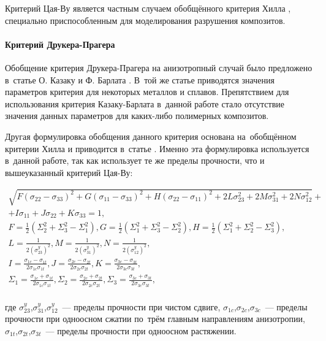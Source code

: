 \documentclass[thesis.tex]{subfiles}
\begin{document}
Критерий Цая-Ву является частным случаем обобщённого критерия Хилла \cite{hill1979theoretical,abrate2008criteria},
специально приспособленным для моделирования разрушения композитов.

\paragraph{Критерий Друкера-Прагера}
Обобщение критерия Друкера-Прагера на анизотропный случай было предложено в~статье О. Казаку и Ф. Барлата
\cite{cazacu2001generalization}. В~той же статье приводятся значения параметров критерия для некоторых металлов и сплавов.
Препятствием для использования критерия Казаку-Барлата в~данной работе стало отсутствие значения данных параметров для
каких-либо полимерных композитов.

Другая формулировка обобщения данного критерия основана на~обобщённом  критерии Хилла и приводится в~статье \cite{liu1997asymmetric}.
Именно эта формулировка используется в~данной работе, так как использует те же пределы прочности, что и вышеуказанный
критерий Цая-Ву:
\newpage
\begin{small}
\begin{gather}
    \sqrt{F(\sigma_{22}-\sigma_{33})^2 + G(\sigma_{11}-\sigma_{33})^2 + H(\sigma_{22}-\sigma_{11})^2+
    2L\sigma_{23}^2+2M\sigma_{31}^2+2N\sigma_{12}^2} + \nonumber \\
    + I\sigma_{11}+J\sigma_{22}+K\sigma_{33} = 1,\\
    F=\frac{1}{2}(\Sigma_2^2+\Sigma_3^2-\Sigma_1^2),
    G=\frac{1}{2}(\Sigma_1^2+\Sigma_3^2-\Sigma_2^2),
    H=\frac{1}{2}(\Sigma_1^2+\Sigma_2^2-\Sigma_3^2), \nonumber \\
    L=\frac{1}{2\left( \sigma_{23}^y \right)^2},
    M=\frac{1}{2\left( \sigma_{31}^y \right)^2},
    N=\frac{1}{2\left( \sigma_{12}^y \right)^2}, \nonumber \\
    I=\frac{\sigma_{1c}-\sigma_{1t}}{2\sigma_{1c}\sigma_{1t}},
    J=\frac{\sigma_{2c}-\sigma_{2t}}{2\sigma_{2c}\sigma_{2t}},
    K=\frac{\sigma_{3c}-\sigma_{3t}}{2\sigma_{3c}\sigma_{3t}}, \nonumber \\
    \Sigma_1=\frac{\sigma_{1c}+\sigma_{1t}}{2\sigma_{1c}\sigma_{1t}},
    \Sigma_2=\frac{\sigma_{2c}+\sigma_{2t}}{2\sigma_{2c}\sigma_{2t}},
    \Sigma_3=\frac{\sigma_{3c}+\sigma_{3t}}{2\sigma_{3c}\sigma_{3t}}, \nonumber \\
\end{gather}
\end{small}
где $\sigma_{23}^y$,$\sigma_{31}^y$,$\sigma_{12}^y$~--- пределы прочности при чистом сдвиге,
$\sigma_{1c}$,$\sigma_{2c}$,$\sigma_{3c}$~--- пределы прочности при одноосном сжатии по~трём главным направлениям
анизотропии, $\sigma_{1t}$,$\sigma_{2t}$,$\sigma_{3t}$~--- пределы прочности при одноосном растяжении.
\end{document}
